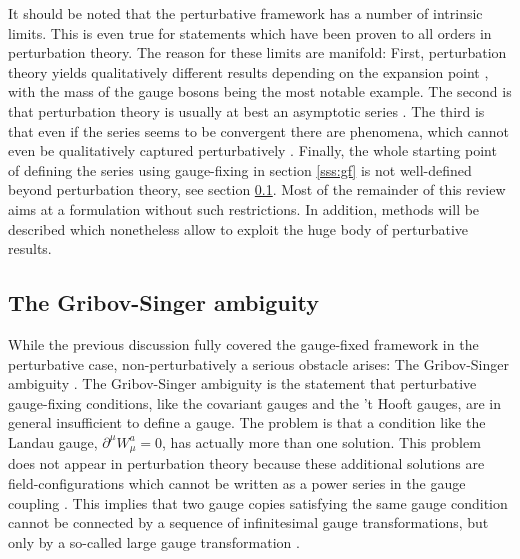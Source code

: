 \documentclass[final,twoside,12pt]{article}
\newcommand*{\pd}{\partial}
\newcommand*{\1}{1\!\!\!\bot}
\begin{document}
It should be noted that the perturbative framework has a number of intrinsic limits. This is even true for statements which have been proven to all orders in perturbation theory. The reason for these limits are manifold: First, perturbation theory yields qualitatively different results depending on the expansion point \cite{Lee:1974zg}, with the mass of the gauge bosons being the most notable example. The second is that perturbation theory is usually at best an asymptotic series \cite{Negele:1988vy,Rivers:1987hi}. The third is that even if the series seems to be convergent there are phenomena, which cannot even be qualitatively captured perturbatively \cite{Shifman:2012zz,Haag:1992hx,Rivers:1987hi}. Finally, the whole starting point of defining the series using gauge-fixing in section \ref{sss:gf} is not well-defined beyond perturbation theory, see section \ref{ss:gribov}. Most of the remainder of this review aims at a formulation without such restrictions. In addition, methods will be described which nonetheless allow to exploit the huge body \cite{pdg,Bohm:2001yx,Djouadi:2005gi,Dawson:2018dcd} of perturbative results. 

\subsection{The Gribov-Singer ambiguity}\label{ss:gribov}

While the previous discussion fully covered the gauge-fixed framework in the perturbative case, non-perturbatively a serious obstacle arises: The Gribov-Singer ambiguity \cite{Gribov:1977wm,Singer:1978dk,vanBaal:1997gu,vanBaal:1991zw,Dell'Antonio:1991xt,Maas:2011se,Vandersickel:2012tg,Sobreiro:2005ec}. The Gribov-Singer ambiguity is the statement that perturbative gauge-fixing conditions, like the covariant gauges and the 't Hooft gauges, are in general insufficient to define a gauge. The problem is that a condition like the Landau gauge, $\pd^\mu W_\mu^a=0$, has actually more than one solution. This problem does not appear in perturbation theory because these additional solutions are field-configurations which cannot be written as a power series in the gauge coupling \cite{Gribov:1977wm}. This implies that two gauge copies satisfying the same gauge condition cannot be connected by a sequence of infinitesimal gauge transformations, but only by a so-called large gauge transformation \cite{Gribov:1977wm}.
\end{document}
